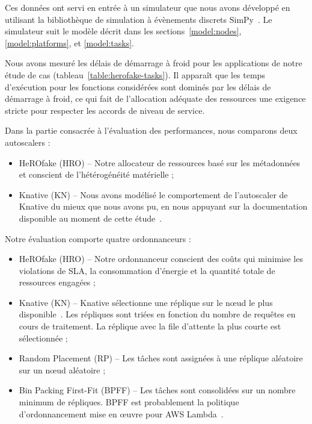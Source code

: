 Ces données ont servi en entrée à un simulateur que nous avons développé en utilisant la bibliothèque de simulation à évènements discrets SimPy~\cite{simpy}. Le simulateur suit le modèle décrit dans les sections~\ref{model:nodes}, \ref{model:platforms}, et \ref{model:tasks}.

Nous avons mesuré les délais de démarrage à froid pour les applications de notre étude de cas (tableau~\ref{table:herofake-tasks}). Il apparaît que les temps d'exécution pour les fonctions considérées sont dominés par les délais de démarrage à froid, ce qui fait de l'allocation adéquate des ressources une exigence stricte pour respecter les accords de niveau de service.

Dans la partie consacrée à l'évaluation des performances, nous comparons deux autoscalers :

\begin{itemize}
    \item HeROfake (HRO) -- Notre allocateur de ressources basé sur les métadonnées et conscient de l'hétérogénéité matérielle ;
    \item Knative (KN) -- Nous avons modélisé le comportement de l'autoscaler de Knative du mieux que nous avons pu, en nous appuyant sur la documentation disponible au moment de cette étude~\cite{knative-autoscaling}.
\end{itemize}

Notre évaluation comporte quatre ordonnanceurs :

\begin{itemize}
    \item HeROfake (HRO) -- Notre ordonnanceur conscient des coûts qui minimise les violations de SLA, la consommation d'énergie et la quantité totale de ressources engagées ;
    \item Knative (KN) -- Knative sélectionne une réplique sur le nœud le plus disponible~\cite{sureshENSUREEfficientScheduling2020}. Les répliques sont triées en fonction du nombre de requêtes en cours de traitement. La réplique avec la file d'attente la plus courte est sélectionnée ;
    \item Random Placement (RP) -- Les tâches sont assignées à une réplique aléatoire sur un nœud aléatoire ;
    \item Bin Packing First-Fit (BPFF) -- Les tâches sont consolidées sur un nombre minimum de répliques. BPFF est probablement la politique d'ordonnancement mise en œuvre pour AWS Lambda~\cite{wangPeekingCurtainsServerlessb}.
\end{itemize}

